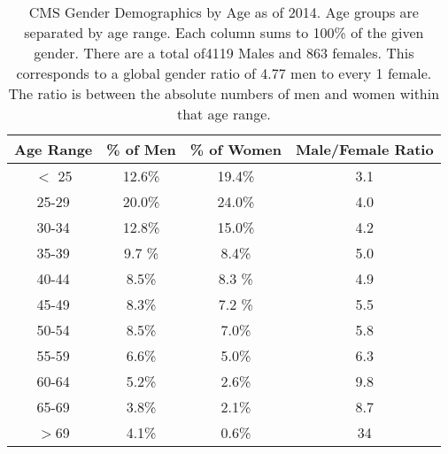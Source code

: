 \begin{center}
\begin{table}[]
\begin{center}
\caption{CMS Gender Demographics by Age as of 2014. Age groups are separated by age range. Each column sums to 100\% of the given gender.
There are a total of4119 Males and 863 females. This corresponds to a global gender ratio of 4.77 men to every 1 female. The ratio is 
between the absolute numbers of men and women within that age range.}
\begin{tabular}{cccc}
\textbf{Age Range} & \textbf{\% of Men} & \textbf{\% of Women} & \textbf{Male/Female Ratio}\\
\hline
$<$ 25 & 12.6\% & 19.4\% & 3.1  \\
25-29 & 20.0\% & 24.0\% & 4.0  \\
30-34 & 12.8\% & 15.0\% & 4.2  \\
35-39 & 9.7 \% & 8.4\%  & 5.0  \\
40-44 & 8.5\%  & 8.3 \% & 4.9  \\
45-49 & 8.3\%  & 7.2 \% & 5.5  \\
50-54 & 8.5\%  & 7.0\%  & 5.8  \\
55-59 & 6.6\%  & 5.0\%  & 6.3  \\
60-64 & 5.2\%  & 2.6\%  & 9.8  \\ 
65-69 & 3.8\%  & 2.1\%  & 8.7  \\
$>$69  & 4.1\%  & 0.6\%  & 34 \\ 
\end{tabular}
\end{center}
\end{table}
\end{center}
